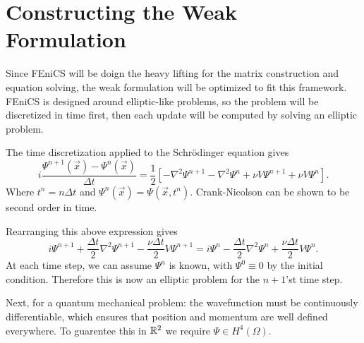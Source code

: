 \documentclass[../../main.tex]{subfiles}
\begin{document}
\section{Constructing the Weak Formulation}

Since FEniCS will be doign the heavy lifting for the matrix construction
and equation solving, the weak formulation will be optimized to fit 
this framework.  
FEniCS is designed around elliptic-like problems,
so the problem will be discretized in time first, 
then each update will be computed by solving an elliptic problem.

The time discretization applied to the Schr\"odinger equation gives
\[
		i \frac{\Psi^{n+1}(\vec x) - \Psi^n(\vec x)}{\Delta t} = 
		\frac{1}{2} \left[-\nabla^2 \Psi^{n+1} - 
		\nabla^2 \Psi^n + \nu V \Psi^{n+1} + \nu V \Psi^n\right]
.\] 
Where $t^n = n \Delta t$ and 
$\Psi^n(\vec x) = \Psi(\vec x, t^n)$.  
Crank-Nicolson can be shown to be second order in time.

Rearranging this above expression gives
\[
		i \Psi^{n+1} + \frac{\Delta t}{2} \nabla^2 \Psi^{n+1} - 
		\frac{\nu \Delta t}{2} V \Psi^{n+1} = 
		i \Psi^n - \frac{\Delta t}{2} \nabla^2 \Psi^n + 
		\frac{\nu \Delta t}{2} V \Psi^n
.\] 
At each time step, we can assume $\Psi^n$ is known, 
with $\Psi^0 \equiv 0$ by the initial condition. 
Therefore this is now an elliptic problem for the $n+1$'st time step.

Next, for a quantum mechanical problem: the wavefunction
must be continuously differentiable, which ensures 
that position and momentum are well defined everywhere.
To guarentee this in $\mathbb{R}^2$ we require 
$\Psi \in H^4(\Omega)$.  
\end{document}
